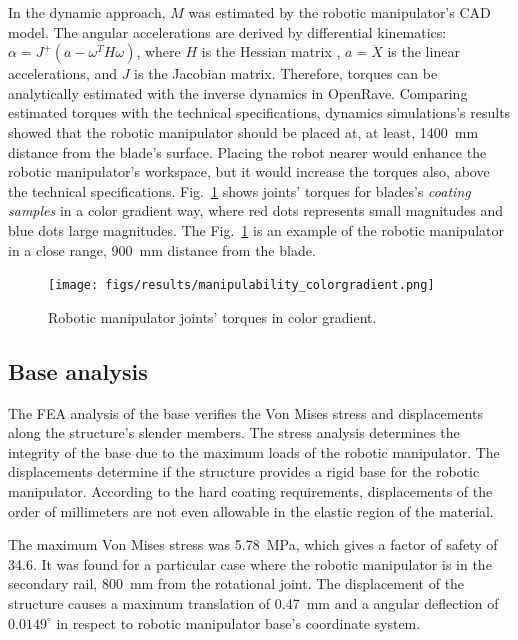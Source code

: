 In the dynamic approach, $M$ was estimated by the robotic manipulator's CAD
model. The angular accelerations are derived by differential kinematics:
$\alpha=J^+(a-\omega^TH\omega)$, where $H$ is the Hessian matrix
\cite{hourtash2005kinematic}, $a=\ddot{X}$ is the linear accelerations, and $J$
is the Jacobian matrix. Therefore, torques can be analytically estimated with
the inverse dynamics in OpenRave. Comparing estimated torques with the technical
specifications, dynamics simulations's results showed that the robotic
manipulator should be placed at, at least, 1400~mm distance from the blade's
surface. Placing the robot nearer would enhance the robotic manipulator's
workspace, but it would increase the torques also, above the technical
specifications. Fig.~\ref{fig:torques} shows joints' torques for blades's
\textit{coating samples} in a color gradient way, where red dots represents
small magnitudes and blue dots large magnitudes. The Fig.~\ref{fig:torques} is
an example of the robotic manipulator in a close range, 900~mm distance from the
blade.

\begin{figure}
	\centering
	\texttt{[image: figs/results/manipulability\_colorgradient.png]}
    \caption{Robotic manipulator joints' torques in color gradient.}
    \label{fig:torques}
\end{figure}

\subsection{Base analysis}
The FEA analysis of the base verifies the Von Mises stress and displacements
along the structure's slender members. The stress analysis determines the
integrity of the base due to the maximum loads of the robotic manipulator. The
displacements determine if the structure provides a rigid base for the robotic
manipulator. According to the hard coating requirements, displacements of the
order of millimeters are not even allowable in the elastic region of the
material.

The maximum Von Mises stress was 5.78~MPa, which gives a factor of safety of
34.6. It was found for a particular case where the robotic manipulator is in
the secondary rail, 800~mm from the rotational joint. The displacement of the
structure causes a maximum translation of 0.47~mm and a angular deflection of
$0.0149^{\circ}$ in respect to robotic manipulator base's coordinate system. 

